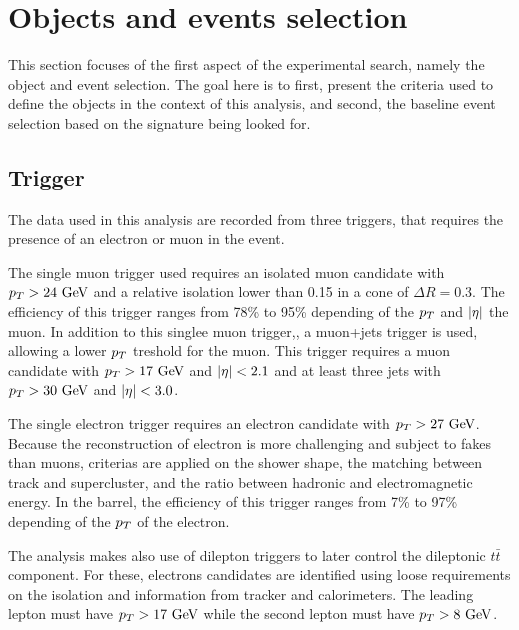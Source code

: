     \section{Objects and events selection \label{sec:analysis_objectAndEventSelection}}

    This section focuses of the first aspect of the experimental search, namely the object 
    and event selection. The goal here is to first, present the criteria used to define the
    objects in the context of this analysis, and second, the baseline event selection based 
    on the signature being looked for.

        \subsection{Trigger}

    
    The data used in this analysis are recorded from three triggers, that requires the
    presence of an electron or muon in the event.
    
    The single muon trigger used requires an isolated muon candidate with $p_T > 24~\text{GeV}$ 
    and a relative isolation lower than 0.15 in a cone of $\Delta R = 0.3$. The efficiency 
    of this trigger ranges from 78\% to 95\% depending of the $p_T$ and $\left| \eta \right|$ the muon.
    In addition to this singlee muon trigger,, a muon+jets trigger is used, allowing a 
    lower $p_T$ treshold for the muon. This trigger requires a muon candidate with 
    $p_T > 17~\text{GeV}$ and $\left| \eta \right| < 2.1$ and at least three jets with $p_T > 30~\text{GeV}$ and 
    $\left| \eta \right| < 3.0$.  

    The single electron trigger requires an electron candidate with $p_T > 27~\text{GeV}$. Because
    the reconstruction of electron is more challenging and subject to fakes than muons, 
    criterias are applied on the shower shape, the matching between track and supercluster, 
    and the ratio between hadronic and electromagnetic energy. In the barrel, the efficiency 
    of this trigger ranges from 7\% to 97\% depending of the $p_T$ of the electron.

    The analysis makes also use of dilepton triggers to later control the dileptonic
    $t\bar{t}$ component. For these, electrons candidates are identified using loose 
    requirements on the isolation and information from tracker and calorimeters. The 
    leading lepton must have $p_T > 17~\text{GeV}$ while the second lepton must have $p_T > 8~\text{GeV}$.


